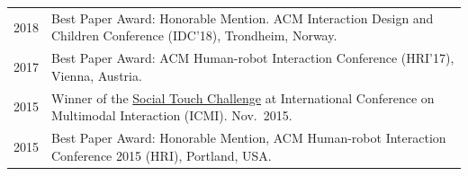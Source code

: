 \begin{tabularx}{\textwidth}{@{}lX@{}}
2018 & Best Paper Award: Honorable Mention. ACM Interaction Design and Children Conference (IDC'18), Trondheim, Norway. \\[2pt]
2017 & Best Paper Award: ACM Human-robot Interaction Conference (HRI'17), Vienna, Austria. \\[2pt]
2015 & Winner of the \href{https://hal.inria.fr/hal-01208300/document}{Social Touch Challenge} at International Conference on Multimodal Interaction (ICMI). Nov.\ 2015. \\[2pt]
2015 & Best Paper Award: Honorable Mention, ACM Human-robot Interaction Conference 2015 (HRI), Portland, USA. \\
\end{tabularx}

